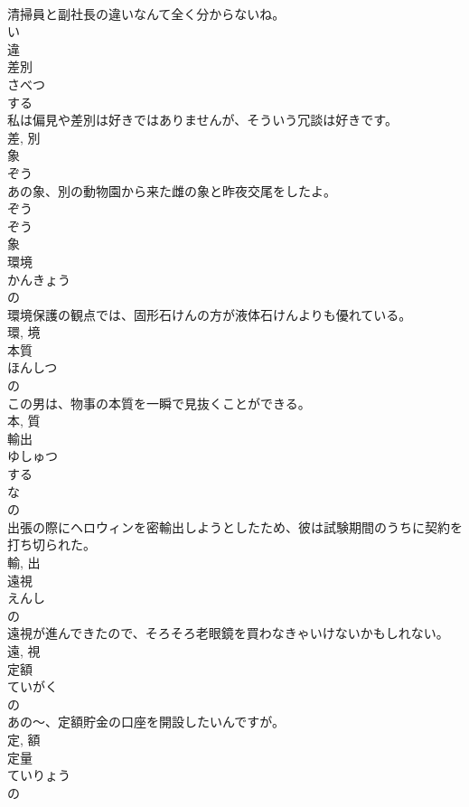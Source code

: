 \documentclass[8pt]{extreport}
\begin{document}
\begin{CJK}{UTF8}{min}
\\	清掃員と副社長の違いなんて全く分からないね。	
\\	い 
\\	違	
\\	差別	
\\	さべつ	
\\	する 
\\	私は偏見や差別は好きではありませんが、そういう冗談は好きです。	
\\	差, 別	
\\	象	
\\	ぞう	
\\	あの象、別の動物園から来た雌の象と昨夜交尾をしたよ。	
\\	ぞう 
\\	ぞう 
\\	象	
\\	環境	
\\	かんきょう	
\\	の 
\\	環境保護の観点では、固形石けんの方が液体石けんよりも優れている。	
\\	環, 境	
\\	本質	
\\	ほんしつ	
\\	の 
\\	この男は、物事の本質を一瞬で見抜くことができる。	
\\	本, 質	
\\	輸出	
\\	ゆしゅつ	
\\	する 
\\	な 
\\	の 
\\	出張の際にヘロウィンを密輸出しようとしたため、彼は試験期間のうちに契約を打ち切られた。	
\\	輸, 出	
\\	遠視	
\\	えんし	
\\	の 
\\	遠視が進んできたので、そろそろ老眼鏡を買わなきゃいけないかもしれない。	
\\	遠, 視	
\\	定額	
\\	ていがく	
\\	の 
\\	あの〜、定額貯金の口座を開設したいんですが。	
\\	定, 額	
\\	定量	
\\	ていりょう	
\\	の 

\end{CJK}
\end{document}
